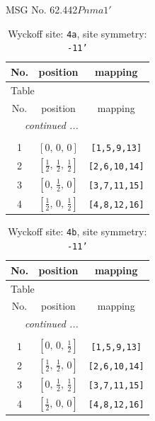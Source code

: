 \documentclass[fleqn,8pt]{jsarticle}
\begin{document}
\setcounter{MaxMatrixCols}{32}

\renewcommand{\tablename}{Table~}
\renewcommand{\figurename}{Figure~}
\begin{center}
\LARGE
MSG No. 62.442\quad$Pnma1'$
\end{center}
\renewcommand{\arraystretch}{1.2}
\begin{longtable}{ccc}
\caption{Wyckoff site: {\tt 4a}, site symmetry: {\tt -11'}}
 \\
 \hline \hline
No. & position & mapping \\ \hline \endfirsthead

\multicolumn{2}{l}{\tablename\ \thetable{}} \\
 \hline \hline
No. & position & mapping \\ \hline \endhead

 \hline \hline
\multicolumn{2}{r}{\footnotesize\it continued ...} \\ \endfoot

 \hline \hline
\multicolumn{2}{r}{} \\ \endlastfoot

1 & $\left[ 0,\, 0,\, 0 \right]$ & {\tt [1,5,9,13]} \\ \hline
2 & $\left[ \frac{1}{2},\, \frac{1}{2},\, \frac{1}{2} \right]$ & {\tt [2,6,10,14]} \\ \hline
3 & $\left[ 0,\, \frac{1}{2},\, 0 \right]$ & {\tt [3,7,11,15]} \\ \hline
4 & $\left[ \frac{1}{2},\, 0,\, \frac{1}{2} \right]$ & {\tt [4,8,12,16]} \\
\end{longtable}
\renewcommand{\arraystretch}{1.2}
\begin{longtable}{ccc}
\caption{Wyckoff site: {\tt 4b}, site symmetry: {\tt -11'}}
 \\
 \hline \hline
No. & position & mapping \\ \hline \endfirsthead

\multicolumn{2}{l}{\tablename\ \thetable{}} \\
 \hline \hline
No. & position & mapping \\ \hline \endhead

 \hline \hline
\multicolumn{2}{r}{\footnotesize\it continued ...} \\ \endfoot

 \hline \hline
\multicolumn{2}{r}{} \\ \endlastfoot

1 & $\left[ 0,\, 0,\, \frac{1}{2} \right]$ & {\tt [1,5,9,13]} \\ \hline
2 & $\left[ \frac{1}{2},\, \frac{1}{2},\, 0 \right]$ & {\tt [2,6,10,14]} \\ \hline
3 & $\left[ 0,\, \frac{1}{2},\, \frac{1}{2} \right]$ & {\tt [3,7,11,15]} \\ \hline
4 & $\left[ \frac{1}{2},\, 0,\, 0 \right]$ & {\tt [4,8,12,16]} \\
\end{longtable}
\end{document}
